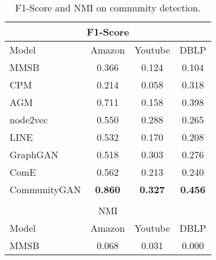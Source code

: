 \documentclass[sigconf]{acmart}
\newcommand{\ComGAN}{CommunityGAN}
\begin{document}
\begin{table}[tbp]
\centering
\caption{F1-Score and NMI on community detection.}
\label{tab:community_detection_result}
\begin{tabular}{cccc}
\multicolumn{4}{c}{F1-Score}
\\ \hline

\multicolumn{1}{|l|}{Model}          & \multicolumn{1}{c|}{Amazon}          & \multicolumn{1}{c|}{Youtube}         & \multicolumn{1}{c|}{DBLP}            \\ \hline \hline
\multicolumn{1}{|l|}{MMSB}           & \multicolumn{1}{c|}{0.366}           & \multicolumn{1}{c|}{0.124}           & \multicolumn{1}{c|}{0.104}           \\ \hline
\multicolumn{1}{|l|}{CPM}            & \multicolumn{1}{c|}{0.214}           & \multicolumn{1}{c|}{0.058}           & \multicolumn{1}{c|}{0.318}           \\ \hline
\multicolumn{1}{|l|}{AGM}            & \multicolumn{1}{c|}{0.711}           & \multicolumn{1}{c|}{0.158}           & \multicolumn{1}{c|}{0.398}           \\ \hline
\multicolumn{1}{|l|}{node2vec}       & \multicolumn{1}{c|}{0.550}           & \multicolumn{1}{c|}{0.288}           & \multicolumn{1}{c|}{0.265}           \\ \hline
\multicolumn{1}{|l|}{LINE}           & \multicolumn{1}{c|}{0.532}           & \multicolumn{1}{c|}{0.170}           & \multicolumn{1}{c|}{0.208}           \\ \hline
\multicolumn{1}{|l|}{GraphGAN}       & \multicolumn{1}{c|}{0.518}           & \multicolumn{1}{c|}{0.303}           & \multicolumn{1}{c|}{0.276}           \\ \hline
\multicolumn{1}{|l|}{ComE}           & \multicolumn{1}{c|}{0.562}           & \multicolumn{1}{c|}{0.213}           & \multicolumn{1}{c|}{0.240}           \\ \hline
\multicolumn{1}{|l|}{\ComGAN}        & \multicolumn{1}{c|}{\textbf{0.860}}  & \multicolumn{1}{c|}{\textbf{0.327}}  & \multicolumn{1}{c|}{\textbf{0.456}}  \\ \hline
\\
\multicolumn{4}{c}{NMI}
\\ \hline
\multicolumn{1}{|l|}{Model}          & \multicolumn{1}{c|}{Amazon}          & \multicolumn{1}{c|}{Youtube}         & \multicolumn{1}{c|}{DBLP}           \\ \hline \hline
\multicolumn{1}{|l|}{MMSB}            & \multicolumn{1}{c|}{0.068}           & \multicolumn{1}{c|}{0.031}           & \multicolumn{1}{c|}{0.000}           \\ \hline

\end{tabular}
\end{table}
\end{document}
